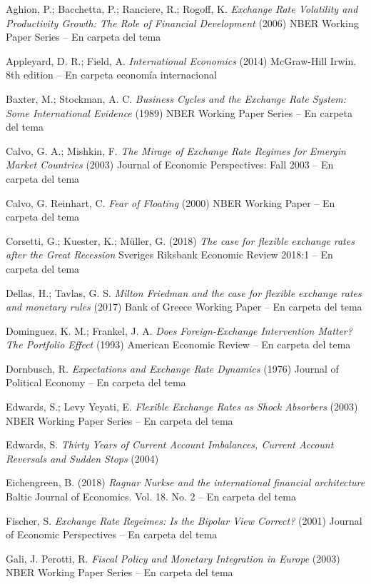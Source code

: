 \documentclass{nuevotema}
\begin{document}
Aghion, P.; Bacchetta, P.; Ranciere, R.; Rogoff, K. \textit{Exchange Rate Volatility and Productivity Growth: The Role of Financial Development} (2006) NBER Working Paper Series -- En carpeta del tema

Appleyard, D. R.; Field, A. \textit{International Economics} (2014) McGraw-Hill Irwin. 8th edition -- En carpeta economía internacional

Baxter, M.; Stockman, A. C. \textit{Business Cycles and the Exchange Rate System: Some International Evidence} (1989) NBER Working Paper Series -- En carpeta del tema

Calvo, G. A.; Mishkin, F. \textit{The Mirage of Exchange Rate Regimes for Emergin Market Countries} (2003) Journal of Economic Perspectives: Fall 2003 -- En carpeta del tema

Calvo, G. Reinhart, C. \textit{Fear of Floating} (2000) NBER Working Paper -- En carpeta del tema

Corsetti, G.; Kuester, K.; Müller, G. (2018) \textit{The case for flexible exchange rates after the Great Recession} Sveriges Riksbank Economic Review 2018:1 -- En carpeta del tema

Dellas, H.; Tavlas, G. S. \textit{Milton Friedman and the case for flexible exchange rates and monetary rules} (2017) Bank of Greece Working Paper -- En carpeta del tema

Dominguez, K. M.; Frankel, J. A. \textit{Does Foreign-Exchange Intervention Matter? The Portfolio Effect} (1993) American Economic Review -- En carpeta del tema

Dornbusch, R. \textit{Expectations and Exchange Rate Dynamics} (1976) Journal of Political Economy -- En carpeta del tema

Edwards, S.; Levy Yeyati, E. \textit{Flexible Exchange Rates as Shock Absorbers} (2003) NBER Working Paper Series -- En carpeta del tema

Edwards, S. \textit{Thirty Years of Current Account Imbalances, Current Account Reversals and Sudden Stops} (2004)

Eichengreen, B. (2018) \textit{Ragnar Nurkse and the international financial architecture} Baltic Journal of Economics. Vol. 18. No. 2 -- En carpeta del tema

Fischer, S. \textit{Exchange Rate Regeimes: Is the Bipolar View Correct?} (2001) Journal of Economic Perspectives -- En carpeta del tema

Gali, J. Perotti, R. \textit{Fiscal Policy and Monetary Integration in Europe} (2003) NBER Working Paper Series -- En carpeta del tema
\end{document}
